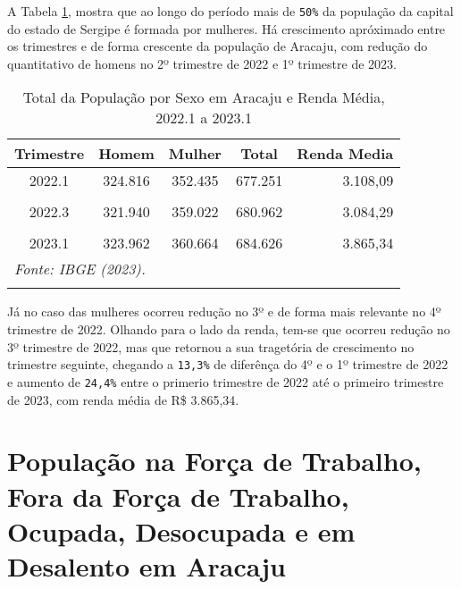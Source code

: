 \documentclass[preprint, 3p,
authoryear]{elsarticle} %
\begin{document}
A Tabela \ref{tab1}, mostra que ao longo do período mais de
\texttt{50\%} da população da capital do estado de Sergipe é formada por
mulheres. Há crescimento apróximado entre os trimestres e de forma
crescente da população de Aracaju, com redução do quantitativo de homens
no 2º trimestre de 2022 e 1º trimestre de 2023.

\begingroup\fontsize{9}{11}\selectfont

\begin{longtable}[t]{ccccr}
\caption{\label{tab:tab1}\label{tab1}Total da População por Sexo em Aracaju e Renda Média, 
2022.1 a 2023.1}\\
\toprule
Trimestre & Homem & Mulher & Total & Renda Media\\
\midrule
2022.1 & 324.816 & 352.435 & 677.251 & 3.108,09\\
\cellcolor[HTML]{DCDCDC}{2022.2} & \cellcolor[HTML]{DCDCDC}{319.497} & \cellcolor[HTML]{DCDCDC}{359.615} & \cellcolor[HTML]{DCDCDC}{679.112} & \cellcolor[HTML]{DCDCDC}{3.136,40}\\
2022.3 & 321.940 & 359.022 & 680.962 & 3.084,29\\
\cellcolor[HTML]{DCDCDC}{2022.4} & \cellcolor[HTML]{DCDCDC}{325.904} & \cellcolor[HTML]{DCDCDC}{356.896} & \cellcolor[HTML]{DCDCDC}{682.800} & \cellcolor[HTML]{DCDCDC}{3.521,83}\\
2023.1 & 323.962 & 360.664 & 684.626 & 3.865,34\\
\bottomrule
\multicolumn{5}{l}{\rule{0pt}{1em}\textit{Fonte: IBGE (2023).}}\\
\multicolumn{5}{l}{\rule{0pt}{1em}}\\
\end{longtable}
\endgroup{}

Já no caso das mulheres ocorreu redução no 3º e de forma mais relevante
no 4º trimestre de 2022. Olhando para o lado da renda, tem-se que
ocorreu redução no 3º trimestre de 2022, mas que retornou a sua
tragetória de crescimento no trimestre seguinte, chegando a
\texttt{13,3\%} de diferênça do 4º e o 1º trimestre de 2022 e aumento de
\texttt{24,4\%} entre o primerio trimestre de 2022 até o primeiro
trimestre de 2023, com renda média de R\$ 3.865,34.

\hypertarget{populauxe7uxe3o-na-foruxe7a-de-trabalho-fora-da-foruxe7a-de-trabalho-ocupada-desocupada-e-em-desalento-em-aracaju}{%
\section{População na Força de Trabalho, Fora da Força de Trabalho,
Ocupada, Desocupada e em Desalento em
Aracaju}\label{populauxe7uxe3o-na-foruxe7a-de-trabalho-fora-da-foruxe7a-de-trabalho-ocupada-desocupada-e-em-desalento-em-aracaju}}
\end{document}
